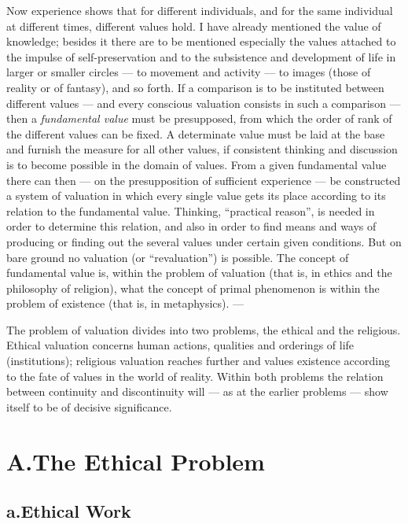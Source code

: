 \documentclass[12pt,a4paper]{book}
\newcommand{\opage}[1]{\marginnote{\footnotesize\textit{[#1]}}}
\begin{document}
Now experience shows that for different individuals, and for the same individual
at different times, different values hold. I have already mentioned the value of
knowledge; besides it there are to be mentioned especially the values attached to
the impulse of self-preservation and to the subsistence and development of life
in larger or smaller circles --- to movement and activity --- to images (those of
reality or of fantasy), and so forth. If a comparison is to be instituted between
different values --- and every conscious valuation consists in such a comparison
--- then a \emph{fundamental value} must be presupposed, from which the order of
rank of the different values can be fixed. A determinate value must be laid at
the base and furnish the measure for all other values, if consistent thinking and
discussion is to become possible in the domain of values. From a given
fundamental value there can then --- on the presupposition of sufficient
experience --- be constructed a system of valuation in which every single value
gets its place according to its relation to the fundamental value. Thinking,
``practical reason'', is needed in order to determine this relation, and also in
order to find means and ways of producing or finding out the several values under
certain given conditions. But on bare ground no valuation (or ``revaluation'') is
possible. The concept of fundamental value is, within the problem of valuation
(that is, in ethics and the \opage{72}philosophy of religion), what the concept of primal
phenomenon is within the problem of existence (that is, in metaphysics). ---

The problem of valuation divides into two problems, the ethical and the
religious. Ethical valuation concerns human actions, qualities and orderings of
life (institutions); religious valuation reaches further and values existence
according to the fate of values in the world of reality. Within both problems the
relation between continuity and discontinuity will --- as at the earlier problems
--- show itself to be of decisive significance.

\section*{A.\quad The Ethical Problem}
\label{sec:etiske}

\subsection*{a.\quad Ethical Work}
\label{sec:etiske-arbejde}
\end{document}
